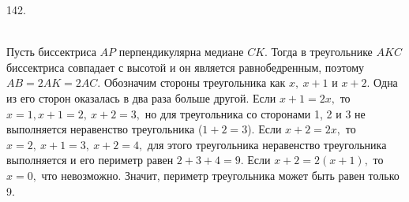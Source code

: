 142. \begin{figure}[ht!]
\end{figure}\\
Пусть биссектриса $AP$ перпендикулярна медиане $CK.$ Тогда в треугольнике $AKC$ биссектриса совпадает с высотой и он является равнобедренным, поэтому $AB=2AK=2AC.$ Обозначим стороны треугольника как $x,\ x+1$ и $x+2.$ Одна из его сторон оказалась в два раза больше другой. Если $x+1=2x,$ то $x=1, x+1=2,\ x+2=3,$ но для треугольника со сторонами 1, 2 и 3 не выполняется неравенство треугольника ($1+2=3$). Если $x+2=2x,$ то $x=2,\ x+1=3,\ x+2=4,$ для этого треугольника неравенство треугольника выполняется и его периметр равен $2+3+4=9.$ Если $x+2=2(x+1),$ то $x=0,$ что невозможно. Значит, периметр треугольника может быть равен только 9.\newpage\noindent
